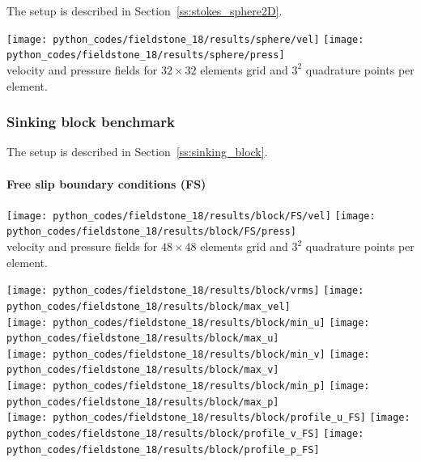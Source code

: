 The setup is described in Section~\ref{ss:stokes_sphere2D}.

\begin{center}
\texttt{[image: python\_codes/fieldstone\_18/results/sphere/vel]}
\texttt{[image: python\_codes/fieldstone\_18/results/sphere/press]}\\
{\captionfont velocity and pressure fields for $32\times 32$ elements grid and $3^2$
quadrature points per element.}
\end{center}

\subsubsection*{Sinking block benchmark}

The setup is described in Section~\ref{ss:sinking_block}.

\paragraph{Free slip boundary conditions (FS)}

\begin{center}
\texttt{[image: python\_codes/fieldstone\_18/results/block/FS/vel]}
\texttt{[image: python\_codes/fieldstone\_18/results/block/FS/press]}\\
{\captionfont velocity and pressure fields for $48\times 48$ elements grid and $3^2$
quadrature points per element.}
\end{center}


\begin{center}
\texttt{[image: python\_codes/fieldstone\_18/results/block/vrms]}
\texttt{[image: python\_codes/fieldstone\_18/results/block/max\_vel]}\\
\texttt{[image: python\_codes/fieldstone\_18/results/block/min\_u]}
\texttt{[image: python\_codes/fieldstone\_18/results/block/max\_u]}\\
\texttt{[image: python\_codes/fieldstone\_18/results/block/min\_v]}
\texttt{[image: python\_codes/fieldstone\_18/results/block/max\_v]}\\
\texttt{[image: python\_codes/fieldstone\_18/results/block/min\_p]}
\texttt{[image: python\_codes/fieldstone\_18/results/block/max\_p]}\\
\texttt{[image: python\_codes/fieldstone\_18/results/block/profile\_u\_FS]}
\texttt{[image: python\_codes/fieldstone\_18/results/block/profile\_v\_FS]}
\texttt{[image: python\_codes/fieldstone\_18/results/block/profile\_p\_FS]}
\end{center}

